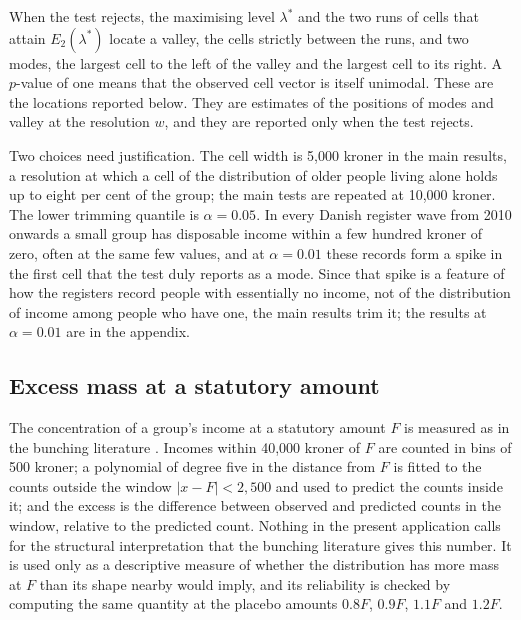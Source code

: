 When the test rejects, the maximising level $\lambda^*$ and the two runs of cells that attain $E_2(\lambda^*)$ locate a valley, the cells strictly between the runs, and two modes, the largest cell to the left of the valley and the largest cell to its right. A $p$-value of one means that the observed cell vector is itself unimodal. These are the locations reported below. They are estimates of the positions of modes and valley at the resolution $w$, and they are reported only when the test rejects.

Two choices need justification. The cell width is 5{,}000 kroner in the main results, a resolution at which a cell of the distribution of older people living alone holds up to eight per cent of the group; the main tests are repeated at 10{,}000 kroner. The lower trimming quantile is $\alpha=0.05$. In every Danish register wave from 2010 onwards a small group has disposable income within a few hundred kroner of zero, often at the same few values, and at $\alpha=0.01$ these records form a spike in the first cell that the test duly reports as a mode. Since that spike is a feature of how the registers record people with essentially no income, not of the distribution of income among people who have one, the main results trim it; the results at $\alpha=0.01$ are in the appendix.

\subsection{Excess mass at a statutory amount}

The concentration of a group's income at a statutory amount $F$ is measured as in the bunching literature \citep{Saez2010,ChettyFriedmanOlsenPistaferri2011,Kleven2016}. Incomes within 40{,}000 kroner of $F$ are counted in bins of 500 kroner; a polynomial of degree five in the distance from $F$ is fitted to the counts outside the window $|x-F|<2{,}500$ and used to predict the counts inside it; and the excess is the difference between observed and predicted counts in the window, relative to the predicted count. Nothing in the present application calls for the structural interpretation that the bunching literature gives this number. It is used only as a descriptive measure of whether the distribution has more mass at $F$ than its shape nearby would imply, and its reliability is checked by computing the same quantity at the placebo amounts $0.8F$, $0.9F$, $1.1F$ and $1.2F$.

